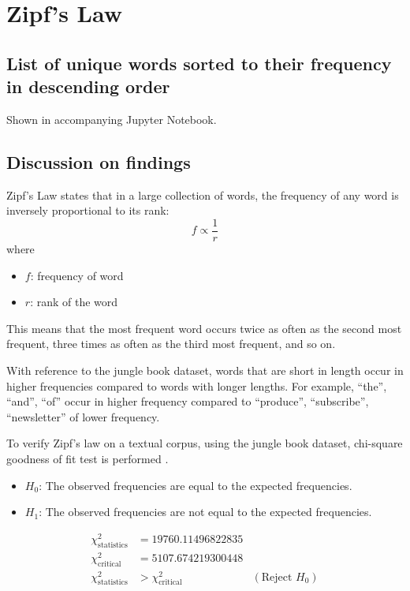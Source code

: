 \section{Zipf's Law}

\subsection*{List of unique words sorted to their frequency in descending order}
Shown in accompanying Jupyter Notebook.


\subsection*{Discussion on findings}
Zipf's Law states that in a large collection of words, the frequency of any word is inversely proportional to its rank:
$$f \propto \frac{1}{r}$$
where  
\begin{itemize}
    \item $f$: frequency of word  
    \item $r$: rank of the word
\end{itemize}

This means that the most frequent word occurs twice as often as the second most frequent, three times as often as the third most frequent, and so on.

With reference to the jungle book dataset, words that are short in length occur in higher frequencies compared to words with longer lengths. 
For example, ``the'', ``and'', ``of'' occur in higher frequency compared to ``produce'', ``subscribe'', ``newsletter'' of lower frequency.
\newline

To verify Zipf's law on a textual corpus, using the jungle book dataset, chi-square goodness of fit test is performed \cite{web:chi_sq_test}.  
\begin{itemize}
    \item $H_0$: The observed frequencies are equal to the expected frequencies.  
    \item $H_1$: The observed frequencies are not equal to the expected frequencies. 
\end{itemize}

\begin{align*}
    \chi^2_{\text{statistics}} & = 19760.11496822835 \\
    \chi^2_{\text{critical}} & = 5107.674219300448 \\
    \chi^2_{\text{statistics}} & > \chi^2_{\text{critical}} & (\text{Reject } H_0)
\end{align*}

